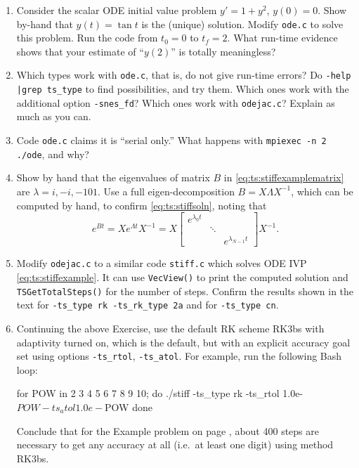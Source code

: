 \renewcommand{\labelenumi}{\arabic{chapter}.\arabic{enumi}\quad}
\renewcommand{\labelenumii}{(\alph{enumii})}
\begin{enumerate}
\item \label{exer:ts:tan}  Consider the scalar ODE initial value problem $y'=1+y^2$, $y(0)=0$.  Show by-hand that $y(t)=\tan t$ is the (unique) solution.  Modify \texttt{ode.c} to solve this problem.  Run the code from $t_0=0$ to $t_f=2$.  What run-time evidence shows that your estimate of ``$y(2)$'' is totally meaningless?

\item \label{exer:ts:odepossible}  Which \pTS types work with \texttt{ode.c}, that is, do not give run-time errors?  Do \texttt{-help |grep ts\_type} to find possibilities, and try them.  Which ones work with the additional option \texttt{-snes\_fd}?  Which ones work with \texttt{odejac.c}?  Explain as much as you can.

\item \label{exer:ts:odeserial}  Code \texttt{ode.c} claims it is ``serial only.''  What happens with \texttt{mpiexec -n 2 ./ode}, and why?

\item \label{exer:ts:stiffexample}  Show by hand that the eigenvalues of matrix $B$ in \eqref{eq:ts:stiffexamplematrix} are $\lambda=i,-i,-101$.  Use a full eigen-decomposition $B = X \Lambda X^{-1}$, which can be computed by hand, to confirm \eqref{eq:ts:stiffsoln}, noting that
    $$e^{Bt} = X e^{\Lambda t} X^{-1} = X \begin{bmatrix} e^{\lambda_0 t} &  &  \\
                       & \ddots &  \\
                       & & e^{\lambda_{N-1} t} \end{bmatrix} X^{-1}.$$

\item \label{exer:ts:stiffcode}  Modify \texttt{odejac.c} to a similar code \texttt{stiff.c} which solves ODE IVP \eqref{eq:ts:stiffexample}.  It can use \texttt{VecView()} to print the computed solution and \texttt{TSGetTotalSteps()} for the number of steps.  Confirm the results shown in the text for \texttt{-ts\_type rk -ts\_rk\_type 2a} and for \texttt{-ts\_type cn}.

\item \label{exer:ts:stiffadaptive}  Continuing the above Exercise, use the default RK scheme RK3bs with adaptivity turned on, which is the default, but with an explicit accuracy goal set using options \texttt{-ts\_rtol}, \texttt{-ts\_atol}.  For example, run the following Bash loop:
\begin{code}
for POW in 2 3 4 5 6 7 8 9 10; do
    ./stiff -ts_type rk -ts_rtol 1.0e-$POW -ts_atol 1.0e-$POW
done
\end{code}
Conclude that for the Example problem on page \pageref{ex:ts:odestiff}, about 400 steps are necessary to get any accuracy at all (i.e.~at least one digit) using method RK3bs.


\end{enumerate}
